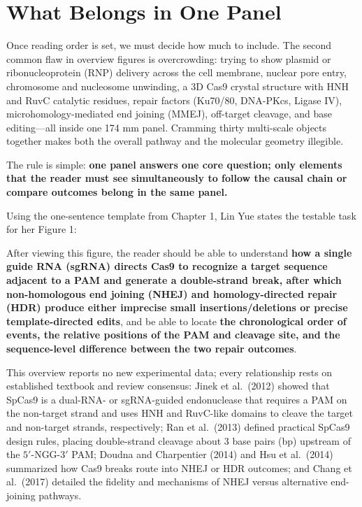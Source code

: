 \section{What Belongs in One Panel}

Once reading order is set, we must decide how much to include. The second common flaw in overview figures is overcrowding: trying to show plasmid or ribonucleoprotein (RNP) delivery across the cell membrane, nuclear pore entry, chromosome and nucleosome unwinding, a 3D Cas9 crystal structure with HNH and RuvC catalytic residues, repair factors (Ku70/80, DNA-PKcs, Ligase IV), microhomology-mediated end joining (MMEJ), off-target cleavage, and base editing—all inside one 174 mm panel. Cramming thirty multi-scale objects together makes both the overall pathway and the molecular geometry illegible.

The rule is simple: \textbf{one panel answers one core question; only elements that the reader must see simultaneously to follow the causal chain or compare outcomes belong in the same panel.}

Using the one-sentence template from Chapter 1, Lin Yue states the testable task for her Figure 1:

\begin{BookNote}
After viewing this figure, the reader should be able to understand \textbf{how a single guide RNA (sgRNA) directs Cas9 to recognize a target sequence adjacent to a PAM and generate a double-strand break, after which non-homologous end joining (NHEJ) and homology-directed repair (HDR) produce either imprecise small insertions/deletions or precise template-directed edits}, and be able to locate \textbf{the chronological order of events, the relative positions of the PAM and cleavage site, and the sequence-level difference between the two repair outcomes}.
\end{BookNote}

This overview reports no new experimental data; every relationship rests on established textbook and review consensus: Jinek et al.\ (2012) showed that SpCas9 is a dual-RNA- or sgRNA-guided endonuclease that requires a PAM on the non-target strand and uses HNH and RuvC-like domains to cleave the target and non-target strands, respectively; Ran et al.\ (2013) defined practical SpCas9 design rules, placing double-strand cleavage about 3 base pairs (bp) upstream of the $5'$-NGG-$3'$ PAM; Doudna and Charpentier (2014) and Hsu et al.\ (2014) summarized how Cas9 breaks route into NHEJ or HDR outcomes; and Chang et al.\ (2017) detailed the fidelity and mechanisms of NHEJ versus alternative end-joining pathways.

